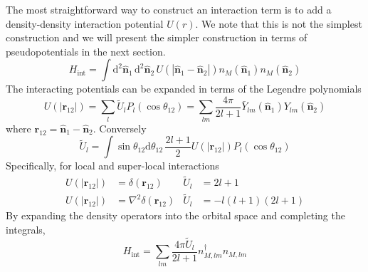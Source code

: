 \documentclass{timesjhep}
\begin{document}
The most straightforward way to construct an interaction term is to add a density-density interaction potential $U(r)$. We note that this is not the simplest construction and we will present the simpler construction in terms of pseudopotentials in the next section. \begin{equation}
    H_\mathrm{int}=\int\mathrm{d}^2\hat{\mathbf{n}}_1\,\mathrm{d}^2\hat{\mathbf{n}}_2\,U(|\hat{\mathbf{n}}_1-\hat{\mathbf{n}}_2|)n_M(\hat{\mathbf{n}}_1)n_M(\hat{\mathbf{n}}_2) 
\end{equation} 
The interacting potentials can be expanded in terms of the Legendre polynomials 
\begin{equation}
    U(|\mathbf{r}_{12}|)=\sum_l\tilde{U}_lP_l(\cos\theta_{12})=\sum_{lm}\frac{4\pi}{2l+1}\bar{Y}_{lm}(\hat{\mathbf{n}}_1)Y_{lm}(\hat{\mathbf{n}}_2)
\end{equation} 
where $\mathbf{r}_{12}=\hat{\mathbf{n}}_1-\hat{\mathbf{n}}_2$. Conversely \begin{equation}
    \tilde{U}_l=\int\sin\theta_{12}\mathrm{d}\theta_{12}\,\frac{2l+1}{2}U(|\mathbf{r}_{12}|)P_l(\cos\theta_{12})
\end{equation} 
Specifically, for local and super-local interactions 
\begin{align}
    U(|\mathbf{r}_{12}|)&=\delta(\mathbf{r}_{12})&\tilde{U}_l&=2l+1\nonumber\\
    U(|\mathbf{r}_{12}|)&=\nabla^2\delta(\mathbf{r}_{12})&\tilde{U}_l&=-l(l+1)(2l+1)     
\end{align}
By expanding the density operators into the orbital space and completing the integrals, 
\begin{equation}
    H_\mathrm{int}=\sum_{lm}\frac{4\pi \tilde{U}_l}{2l+1}n^\dagger_{M,lm}n_{M,lm}
\end{equation} 
\end{document}
